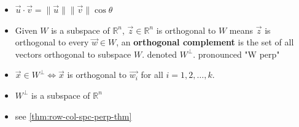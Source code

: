 \documentclass[a4paper,12pt]{article}
\theoremstyle{definition}
\theoremstyle{definition}
\newcommand{\dotprod}[2]{#1 \cdot #2}
\newcommand{\dotprodvecs}[2]{\dotprod{\vec{#1}}{\vec{#2}}}
\newcommand{\norm}[1]{\lVert #1 \rVert}
\newcommand{\normvec}[1]{\norm{\vec{#1}}}
\begin{document}
\begin{itemize}
		\item $\dotprodvecs{u}{v} = \normvec{u}\normvec{v}\cos\theta$
		
		\item Given $W$ is a subspace of $\mathbb{R}^n$, $\vec{z} \in \mathbb{R}^n$ is orthogonal to $W$ means $\vec{z}$ is orthogonal to every $\vec{w} \in W$, an \textbf{orthogonal complement} is the set of all vectors orthogonal to subspace $W$. denoted $W^\perp$. pronounced "W perp"
		
		\item $\vec{x} \in W^\perp \Leftrightarrow \vec{x}$ is orthogonal to $\vec{w_i}$ for all $i = 1, 2, \ldots, k$.
		
		\item $W^\perp$ is a subspace of $\mathbb{R}^n$
		
		\item see \autoref{thm:row-col-spc-perp-thm}
	\end{itemize}
	
\end{document}

